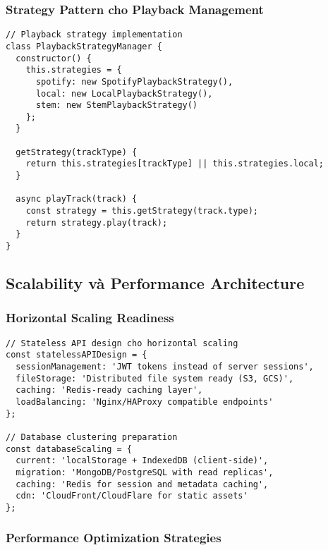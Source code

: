 \documentclass[12pt,a4paper]{article}
\begin{document}
\subsubsection{Strategy Pattern cho Playback Management}

\begin{lstlisting}[caption={Playback strategy implementation}]
// Playback strategy implementation
class PlaybackStrategyManager {
  constructor() {
    this.strategies = {
      spotify: new SpotifyPlaybackStrategy(),
      local: new LocalPlaybackStrategy(),
      stem: new StemPlaybackStrategy()
    };
  }
  
  getStrategy(trackType) {
    return this.strategies[trackType] || this.strategies.local;
  }
  
  async playTrack(track) {
    const strategy = this.getStrategy(track.type);
    return strategy.play(track);
  }
}
\end{lstlisting}

\subsection{Scalability và Performance Architecture}

\subsubsection{Horizontal Scaling Readiness}

\begin{lstlisting}[caption={Stateless API design cho horizontal scaling}]
// Stateless API design cho horizontal scaling
const statelessAPIDesign = {
  sessionManagement: 'JWT tokens instead of server sessions',
  fileStorage: 'Distributed file system ready (S3, GCS)',
  caching: 'Redis-ready caching layer',
  loadBalancing: 'Nginx/HAProxy compatible endpoints'
};

// Database clustering preparation
const databaseScaling = {
  current: 'localStorage + IndexedDB (client-side)',
  migration: 'MongoDB/PostgreSQL with read replicas',
  caching: 'Redis for session and metadata caching',
  cdn: 'CloudFront/CloudFlare for static assets'
};
\end{lstlisting}

\subsubsection{Performance Optimization Strategies}
\end{document}
